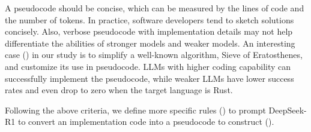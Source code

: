 A pseudocode should be concise, which can be measured by the lines of code and the number of tokens.
In practice, software developers tend to sketch solutions concisely.
Also, verbose pseudocode with implementation details may not help differentiate the abilities of stronger models and weaker models.
An interesting case () in our study is to simplify a well-known algorithm, Sieve of Eratosthenes, and customize its use in pseudocode.
LLMs with higher coding capability can successfully implement the pseudocode, while weaker LLMs have lower success rates and even drop to zero when the target language is Rust.

Following the above criteria, we define more specific rules () to prompt DeepSeek-R1 to convert an implementation code into a pseudocode to construct \benchname ().
